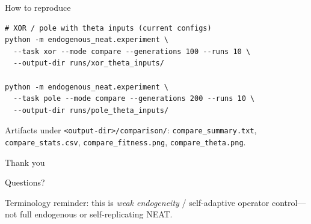 \documentclass[aspectratio=169,11pt]{beamer}
\begin{document}
\begin{frame}{How to reproduce}
  \begin{verbatim}
# XOR / pole with theta inputs (current configs)
python -m endogenous_neat.experiment \
  --task xor --mode compare --generations 100 --runs 10 \
  --output-dir runs/xor_theta_inputs/

python -m endogenous_neat.experiment \
  --task pole --mode compare --generations 200 --runs 10 \
  --output-dir runs/pole_theta_inputs/
  \end{verbatim}

  Artifacts under \texttt{<output-dir>/comparison/}:
  \texttt{compare\_summary.txt}, \texttt{compare\_stats.csv},
  \texttt{compare\_fitness.png}, \texttt{compare\_theta.png}.
\end{frame}

\begin{frame}{Thank you}
  \begin{center}
    \Large Questions?
  \end{center}

  \vspace{1.5em}
  \small
  Terminology reminder: this is \emph{weak endogeneity} / self-adaptive operator control---not
  full endogenous or self-replicating NEAT.
\end{frame}
\end{document}

